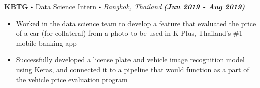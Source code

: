 \documentclass[10pt]{article}
\newcommand\sbullet[1][.5]{\mathbin{\vcenter{\hbox{\scalebox{#1}{$\bullet$}}}}}
\begin{document}
\textbf{\large KBTG $\sbullet$} {\large Data Science Intern $\sbullet$ \textit{Bangkok, Thailand}} {\hfill \textit{\textbf{(Jun 2019 - Aug 2019)}}}

  \vspace*{-0.2cm}
  \begin{itemize}
    \itemsep-0.4em
    \item \textcolor{lighterG}{Worked in the data science team to develop a feature that evaluated the price of a car (for collateral) from a photo to be used in K-Plus, Thailand's \#1 mobile banking app}
    \item \textcolor{lighterG}{Successfully developed a license plate and vehicle image recognition model using Keras, and connected it to a pipeline that would function as a part of the vehicle price evaluation program}
  \end{itemize}
\end{document}
